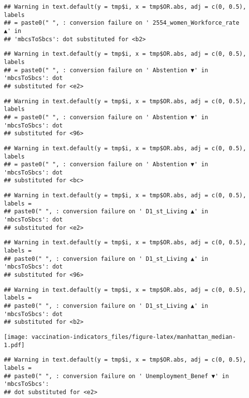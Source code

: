 \documentclass[
]{article}
\begin{document}
\begin{verbatim}
## Warning in text.default(y = tmp$i, x = tmp$OR.abs, adj = c(0, 0.5), labels
## = paste0(" ", : conversion failure on ' 2554_women_Workforce_rate ▲' in
## 'mbcsToSbcs': dot substituted for <b2>
\end{verbatim}

\begin{verbatim}
## Warning in text.default(y = tmp$i, x = tmp$OR.abs, adj = c(0, 0.5), labels
## = paste0(" ", : conversion failure on ' Abstention ▼' in 'mbcsToSbcs': dot
## substituted for <e2>
\end{verbatim}

\begin{verbatim}
## Warning in text.default(y = tmp$i, x = tmp$OR.abs, adj = c(0, 0.5), labels
## = paste0(" ", : conversion failure on ' Abstention ▼' in 'mbcsToSbcs': dot
## substituted for <96>
\end{verbatim}

\begin{verbatim}
## Warning in text.default(y = tmp$i, x = tmp$OR.abs, adj = c(0, 0.5), labels
## = paste0(" ", : conversion failure on ' Abstention ▼' in 'mbcsToSbcs': dot
## substituted for <bc>
\end{verbatim}

\begin{verbatim}
## Warning in text.default(y = tmp$i, x = tmp$OR.abs, adj = c(0, 0.5), labels =
## paste0(" ", : conversion failure on ' D1_st_Living ▲' in 'mbcsToSbcs': dot
## substituted for <e2>
\end{verbatim}

\begin{verbatim}
## Warning in text.default(y = tmp$i, x = tmp$OR.abs, adj = c(0, 0.5), labels =
## paste0(" ", : conversion failure on ' D1_st_Living ▲' in 'mbcsToSbcs': dot
## substituted for <96>
\end{verbatim}

\begin{verbatim}
## Warning in text.default(y = tmp$i, x = tmp$OR.abs, adj = c(0, 0.5), labels =
## paste0(" ", : conversion failure on ' D1_st_Living ▲' in 'mbcsToSbcs': dot
## substituted for <b2>
\end{verbatim}

\texttt{[image: vaccination-indicators\_files/figure-latex/manhattan\_median-1.pdf]}

\begin{verbatim}
## Warning in text.default(y = tmp$i, x = tmp$OR.abs, adj = c(0, 0.5), labels =
## paste0(" ", : conversion failure on ' Unemployment_Benef ▼' in 'mbcsToSbcs':
## dot substituted for <e2>
\end{verbatim}
\end{document}
